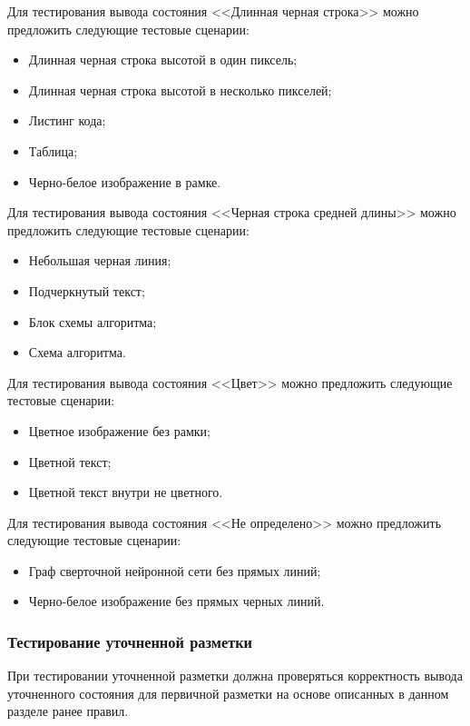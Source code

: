Для тестирования вывода состояния <<Длинная черная строка>> можно предложить следующие тестовые сценарии:
\begin{itemize}
    \item Длинная черная строка высотой в один пиксель;
    \item Длинная черная строка высотой в несколько пикселей;
    \item Листинг кода;
    \item Таблица;
    \item Черно-белое изображение в рамке.
\end{itemize}

Для тестирования вывода состояния <<Черная строка средней длины>> можно предложить следующие тестовые сценарии:
\begin{itemize}
    \item Небольшая черная линия;
    \item Подчеркнутый текст;
    \item Блок схемы алгоритма;
    \item Схема алгоритма.
\end{itemize}

Для тестирования вывода состояния <<Цвет>> можно предложить следующие тестовые сценарии:
\begin{itemize}
    \item Цветное изображение без рамки;
    \item Цветной текст;
    \item Цветной текст внутри не цветного.
\end{itemize}

Для тестирования вывода состояния <<Не определено>> можно предложить следующие тестовые сценарии:
\begin{itemize}
    \item Граф сверточной нейронной сети без прямых линий;
    \item Черно-белое изображение без прямых черных линий.
\end{itemize}

\subsubsection{Тестирование уточненной разметки}

При тестировании уточненной разметки должна проверяться корректность вывода уточненного состояния для первичной разметки на основе описанных в данном разделе ранее правил.


